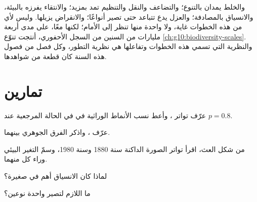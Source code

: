 \begin{remark}\label{rem:g12:selection-drift-speciation:assembled}
 والخلط يمدان بالتنوع؛ والتضاعف والنقل 
والتنظيم  تمد بمزيد؛ والانتقاء يفرزه بالبيئة، والانسياق
بالمصادفة؛ والعزل يدع  تتباعد حتى تصير أنواعًا؛ والانقراض
يزيلها. وليس لأي من هذه الخطوات غاية، ولا واحدة منها تنظر إلى الأمام؛
لكنها معًا، على مدى أربعة مليارات من السنين من السجل الأحفوري، أنتجت
تنوّع \cref{ch:g10:biodiversity-scales}. والنظرية التي تسمي هذه
الخطوات وتفاعلها هي نظرية التطور، وكل فصل من فصول هذه السنة كان قطعة
من شواهدها.
\end{remark}

\section{تمارين}

\begin{exercise}[$\star$]\label{exo:g12:selection-drift-speciation:1}
عرّف تواتر ، وأعط نسب الأنماط الوراثية في  في الحالة
المرجعية عند $p = 0.8$.
\end{exercise}

\begin{exercise}[$\star$]\label{exo:g12:selection-drift-speciation:2}
عرّف  ، واذكر الفرق الجوهري بينهما.
\end{exercise}

\begin{exercise}[$\star$]\label{exo:g12:selection-drift-speciation:3}
من شكل العث، اقرأ تواتر الصورة الداكنة سنة 1880 وسنة 1980، وسمّ التغير
البيئي وراء كل منهما.
\end{exercise}

\begin{exercise}[$\star$]\label{exo:g12:selection-drift-speciation:4}
لماذا كان الانسياق أهم في  صغيرة؟
\end{exercise}

\begin{exercise}[$\star$]\label{exo:g12:selection-drift-speciation:5}
ما اللازم لتصير  واحدة نوعين؟
\end{exercise}

